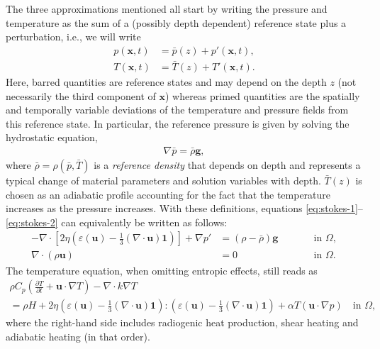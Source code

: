 \documentclass{article}
\begin{document}
The three approximations mentioned all start by writing the pressure and
temperature as the sum of a (possibly depth dependent)
reference state plus a perturbation, i.e., we will write
\begin{align*}
  p(\mathbf x,t) &= \bar p(z) + p'(\mathbf x,t),
  \\
  T(\mathbf x,t) &= \bar T(z) + T'(\mathbf x,t).
\end{align*}
Here, barred quantities are reference states and may depend on the depth $z$
(not necessarily the third component of $\mathbf x$) whereas primed quantities
are the spatially and temporally variable deviations of the temperature and
pressure fields from this reference state. In particular, the reference pressure
is given by solving the hydrostatic equation,
\begin{align}
\label{eq:hydrostatic-pressure}
  \nabla \bar p = \bar\rho \mathbf g,
\end{align}
where $\bar\rho=\rho(\bar p,\bar T)$ is a \textit{reference density} that
depends on depth and represents a typical change of material parameters and solution 
variables with depth. $\bar T(z)$ is chosen as an adiabatic profile accounting for the
fact that the temperature increases as the pressure increases.
With these definitions, equations \eqref{eq:stokes-1}--\eqref{eq:stokes-2} can equivalently be written as follows:
\begin{align}
  \label{eq:stokes-decomposed-1}
  -\nabla \cdot \left[2\eta \left(\varepsilon(\mathbf u)
                                  - \frac{1}{3}(\nabla \cdot \mathbf u)\mathbf 1\right)
                \right] + \nabla p' &=
  (\rho-\bar\rho) \mathbf g
  & \qquad
  & \textrm{in $\Omega$},
  \\
  \label{eq:stokes-decomposed-2}
  \nabla \cdot (\rho \mathbf u) &= 0
  & \qquad
  & \textrm{in $\Omega$}.
\end{align}
The temperature equation, when omitting entropic effects, still reads as
\begin{multline}
  \label{eq:temperature-decomposed}
  \rho C_p \left(\frac{\partial T}{\partial t} + \mathbf u\cdot\nabla T\right)
  - \nabla\cdot k\nabla T
  \\
  =
  \rho H
  +
  2\eta
  \left(\varepsilon(\mathbf u) - \frac{1}{3}(\nabla \cdot \mathbf u)\mathbf 1\right)
  :
  \left(\varepsilon(\mathbf u) - \frac{1}{3}(\nabla \cdot \mathbf u)\mathbf 1\right)
  +\alpha T \left( \mathbf u \cdot \nabla p \right)
  \quad
  \textrm{in $\Omega$},
\end{multline}
where the right-hand side includes radiogenic heat production, shear heating and adiabatic heating (in that order).
  
\end{document}
